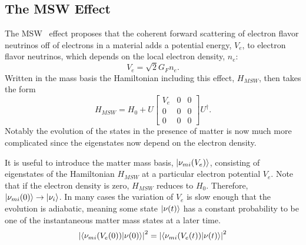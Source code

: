 \subsection{The MSW Effect}

The MSW~\cite{wolfenstein,mikheyev} effect proposes that the coherent forward scattering of electron flavor neutrinos off of electrons in a material adds a potential energy, $V_e$, to electron flavor neutrinos, which depends on the local electron density, $n_e$:
\begin{equation}
V_e = \sqrt{2} G_F n_e.
\end{equation}
Written in the mass basis the Hamiltonian including this effect, $H_{MSW}$, then takes the form
\begin{equation}
H_{MSW} = H_{0} + U\begin{bmatrix}
V_e & 0 & 0 \\
0 & 0 & 0 \\
0 & 0 & 0
\end{bmatrix}U^\dagger.
\label{eq:msw}
\end{equation}
Notably the evolution of the states in the presence of matter is now much more complicated since the eigenstates now depend on the electron density.

It is useful to introduce the matter mass basis, $\ket{\nu_{mi}(V_e)}$, consisting of eigenstates of the Hamiltonian $H_{MSW}$ at a particular electron potential $V_e$.
Note that if the electron density is zero, $H_{MSW}$ reduces to $H_0$. Therefore, $\ket{\nu_{mi}(0)} \rightarrow \ket{\nu_{i}}$.
In many cases the variation of $V_e$ is slow enough that the evolution is adiabatic, meaning some state $\ket{\nu(t)}$ has a constant probability to be one of the instantaneous matter mass states at a later time. 
\begin{equation}
\left| \braket{\nu_{mi}(V_e(0))}{\nu(0)} \right|^2 = \left| \braket{\nu_{mi}(V_e(t))}{\nu(t)} \right |^2
\end{equation}

